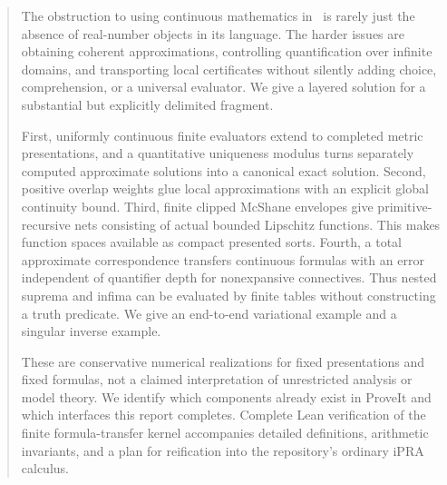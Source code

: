 \documentclass[11pt,a4paper]{article}
\numberwithin{equation}{section}
\theoremstyle{definition}
\theoremstyle{remark}\newtheorem{remark}[theorem]{Remark}
\begin{document}
\begin{abstract}
The obstruction to using continuous mathematics in \ipra\ is rarely just the absence of real-number objects in its language. The harder issues are obtaining coherent approximations, controlling quantification over infinite domains, and transporting local certificates without silently adding choice, comprehension, or a universal evaluator. We give a layered solution for a substantial but explicitly delimited fragment.

First, uniformly continuous finite evaluators extend to completed metric presentations, and a quantitative uniqueness modulus turns separately computed approximate solutions into a canonical exact solution. Second, positive overlap weights glue local approximations with an explicit global continuity bound. Third, finite clipped McShane envelopes give primitive-recursive nets consisting of actual bounded Lipschitz functions. This makes function spaces available as compact presented sorts. Fourth, a total approximate correspondence transfers continuous formulas with an error independent of quantifier depth for nonexpansive connectives. Thus nested suprema and infima can be evaluated by finite tables without constructing a truth predicate. We give an end-to-end variational example and a singular inverse example.

These are conservative numerical realizations for fixed presentations and fixed formulas, not a claimed interpretation of unrestricted analysis or model theory. We identify which components already exist in ProveIt and which interfaces this report completes. Complete Lean verification of the finite formula-transfer kernel accompanies detailed definitions, arithmetic invariants, and a plan for reification into the repository's ordinary iPRA calculus.
\end{abstract}
\begingroup
\small
\setlength{\parskip}{0pt}
\tableofcontents
\endgroup
\clearpage








\end{document}
